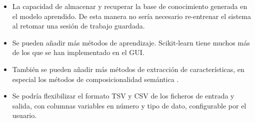 \begin{itemize}
\item La capacidad de almacenar y recuperar la base de conocimiento generada en el modelo aprendido. De esta manera no sería necesario re-entrenar el sistema al retomar una sesión de trabajo guardada.
\item Se pueden añadir más métodos de aprendizaje. Scikit-learn tiene muchos más de los que se han implementado en el GUI.
\item También se pueden añadir más métodos de extracción de características, en especial los métodos de composicionalidad semántica \citep{Socher2013}.
\item Se podría flexibilizar el formato TSV y CSV de los ficheros de entrada y salida, con columnas variables en número y tipo de dato, configurable por el usuario.
\end{itemize}
